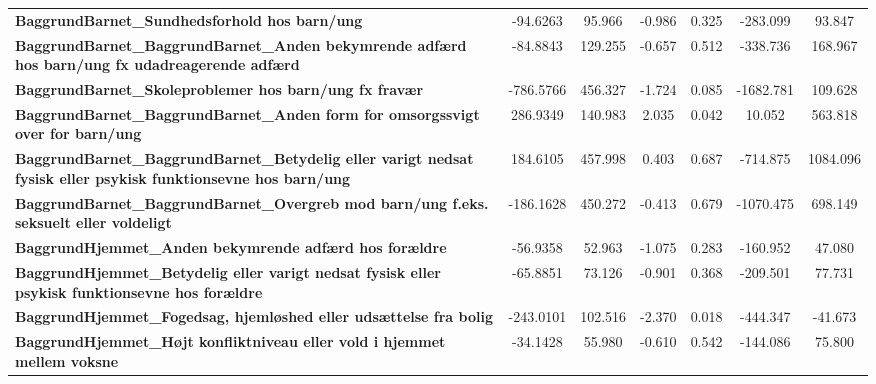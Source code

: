 \begin{center}
\begin{tabular}{lcccccc}
\textbf{BaggrundBarnet\_Sundhedsforhold hos barn/ung}                                                                          &     -94.6263  &       95.966     &    -0.986  &         0.325        &     -283.099    &       93.847     \\
\textbf{BaggrundBarnet\_BaggrundBarnet\_Anden bekymrende adfærd hos barn/ung fx udadreagerende adfærd}                         &     -84.8843  &      129.255     &    -0.657  &         0.512        &     -338.736    &      168.967     \\
\textbf{BaggrundBarnet\_Skoleproblemer hos barn/ung fx fravær}                                                                 &    -786.5766  &      456.327     &    -1.724  &         0.085        &    -1682.781    &      109.628     \\
\textbf{BaggrundBarnet\_BaggrundBarnet\_Anden form for omsorgssvigt over for barn/ung}                                         &     286.9349  &      140.983     &     2.035  &         0.042        &       10.052    &      563.818     \\
\textbf{BaggrundBarnet\_BaggrundBarnet\_Betydelig eller varigt nedsat fysisk eller psykisk funktionsevne hos barn/ung}         &     184.6105  &      457.998     &     0.403  &         0.687        &     -714.875    &     1084.096     \\
\textbf{BaggrundBarnet\_BaggrundBarnet\_Overgreb mod barn/ung f.eks. seksuelt eller voldeligt}                                 &    -186.1628  &      450.272     &    -0.413  &         0.679        &    -1070.475    &      698.149     \\
\textbf{BaggrundHjemmet\_Anden bekymrende adfærd hos forældre}                                                                 &     -56.9358  &       52.963     &    -1.075  &         0.283        &     -160.952    &       47.080     \\
\textbf{BaggrundHjemmet\_Betydelig eller varigt nedsat fysisk eller psykisk funktionsevne hos forældre}                        &     -65.8851  &       73.126     &    -0.901  &         0.368        &     -209.501    &       77.731     \\
\textbf{BaggrundHjemmet\_Fogedsag, hjemløshed eller udsættelse fra bolig}                                                      &    -243.0101  &      102.516     &    -2.370  &         0.018        &     -444.347    &      -41.673     \\
\textbf{BaggrundHjemmet\_Højt konfliktniveau eller vold i hjemmet mellem voksne}                                               &     -34.1428  &       55.980     &    -0.610  &         0.542        &     -144.086    &       75.800     \\

\end{tabular}
\end{center}
